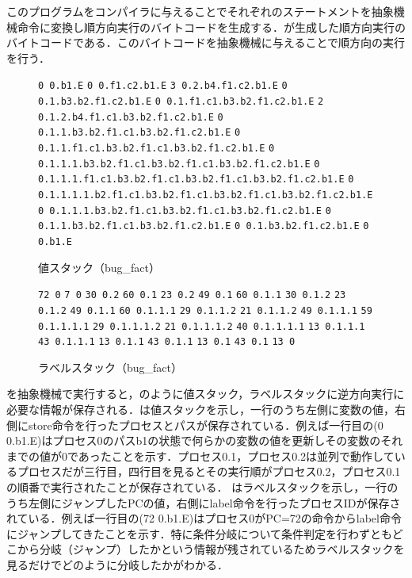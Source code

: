 \documentclass[submit,PRO]{ipsj}
\def\|{\verb|}
\begin{document}
このプログラムをコンパイラに与えることでそれぞれのステートメントを抽象機械命令に変換し順方向実行のバイトコードを生成する．が生成した順方向実行のバイトコードである．このバイトコードを抽象機械に与えることで順方向の実行を行う．

\begin{figure}[tb]
\vbox{
\hbox{\|0 0.b1.E|}
\hbox{\|0 0.f1.c2.b1.E|}
\hbox{\|3 0.2.b4.f1.c2.b1.E|}
\hbox{\|0 0.1.b3.b2.f1.c2.b1.E|}
\hbox{\|0 0.1.f1.c1.b3.b2.f1.c2.b1.E|}
\hbox{\|2 0.1.2.b4.f1.c1.b3.b2.f1.c2.b1.E|}
\hbox{\|0 0.1.1.b3.b2.f1.c1.b3.b2.f1.c2.b1.E|}
\hbox{\|0 0.1.1.f1.c1.b3.b2.f1.c1.b3.b2.f1.c2.b1.E|}
\hbox{\|0 0.1.1.1.b3.b2.f1.c1.b3.b2.f1.c1.b3.b2.f1.c2.b1.E|}
\hbox{\|0 0.1.1.1.f1.c1.b3.b2.f1.c1.b3.b2.f1.c1.b3.b2.f1.c2.b1.E|}
\hbox{\|0 0.1.1.1.1.b2.f1.c1.b3.b2.f1.c1.b3.b2.f1.c1.b3.b2.f1.c2.b1.E|}
\hbox{\|0 0.1.1.1.b3.b2.f1.c1.b3.b2.f1.c1.b3.b2.f1.c2.b1.E|}
\hbox{\|0 0.1.1.b3.b2.f1.c1.b3.b2.f1.c2.b1.E|}
\hbox{\|0 0.1.b3.b2.f1.c2.b1.E|}
\hbox{\|0 0.b1.E|}
}
\centerline{}
\caption{値スタック（bug\_fact）}
\label{fig:value}
\end{figure}

\begin{figure}[tb]
\vbox{
\hbox{\|72 0|}
\hbox{\|7 0|}
\hbox{\|30 0.2|}
\hbox{\|60 0.1|}
\hbox{\|23 0.2|}
\hbox{\|49 0.1|}
\hbox{\|60 0.1.1|}
\hbox{\|30 0.1.2|}
\hbox{\|23 0.1.2|}
\hbox{\|49 0.1.1|}
\hbox{\|60 0.1.1.1|}
\hbox{\|29 0.1.1.2|}
\hbox{\|21 0.1.1.2|}
\hbox{\|49 0.1.1.1|}
\hbox{\|59 0.1.1.1.1|}
\hbox{\|29 0.1.1.1.2|}
\hbox{\|21 0.1.1.1.2|}
\hbox{\|40 0.1.1.1.1|}
\hbox{\|13 0.1.1.1|}
\hbox{\|43 0.1.1.1|}
\hbox{\|13 0.1.1|}
\hbox{\|43 0.1.1|}
\hbox{\|13 0.1|}
\hbox{\|43 0.1|}
\hbox{\|13 0|}
}
\centerline{}
\caption{ラベルスタック（bug\_fact）}
\label{fig:label}
\end{figure}



を抽象機械で実行すると，のように値スタック，ラベルスタックに逆方向実行に必要な情報が保存される．は値スタックを示し，一行のうち左側に変数の値，右側にstore命令を行ったプロセスとパスが保存されている．例えば一行目の(0 0.b1.E)はプロセス0のパスb1の状態で何らかの変数の値を更新しその変数のそれまでの値が0であったことを示す．プロセス0.1，プロセス0.2は並列で動作しているプロセスだが三行目，四行目を見るとその実行順がプロセス0.2，プロセス0.1の順番で実行されたことが保存されている．
はラベルスタックを示し，一行のうち左側にジャンプしたPCの値，右側にlabel命令を行ったプロセスIDが保存されている．例えば一行目の(72 0.b1.E)はプロセス0がPC=72の命令からlabel命令にジャンプしてきたことを示す．特に条件分岐について条件判定を行わずともどこから分岐（ジャンプ）したかという情報が残されているためラベルスタックを見るだけでどのように分岐したかがわかる．
\end{document}
